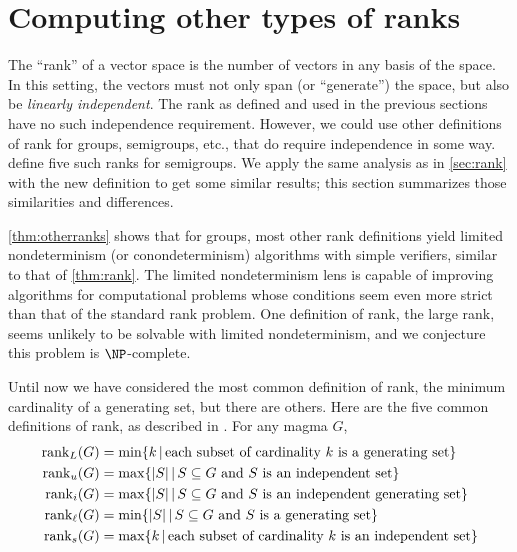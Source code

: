 \section{Computing other types of ranks}
\label{sec:otherranks}

%
%
%
The ``rank'' of a vector space is the number of vectors in any basis of the space.
In this setting, the vectors must not only span (or ``generate'') the space, but also be \emph{linearly independent}.
The rank as defined and used in the previous sections have no such independence requirement.
%
%
However, we could use other definitions of rank for groups, semigroups, etc., that do require independence in some way.
\autocite{hr99, hr00} define five such ranks for semigroups.
%
%
We apply the same analysis as in \autoref{sec:rank} with the new definition to get some similar results;
%
%
this section summarizes those similarities and differences.

%
%
%
\autoref{thm:otherranks} shows that for groups, most other rank definitions yield limited nondeterminism (or conondeterminism) algorithms with simple verifiers, similar to that of \autoref{thm:rank}.
%
%
The limited nondeterminism lens is capable of improving algorithms for computational problems whose conditions seem even more strict than that of the standard rank problem.
%
One definition of rank, the large rank, seems unlikely to be solvable with limited nondeterminism, and we conjecture this problem is $\NP$-complete.

Until now we have considered the most common definition of rank, the minimum cardinality of a generating set, but there are others.
Here are the five common definitions of rank, as described in \autocite{hr99, hr00}.
For any magma $G$,
\begin{align*}
  \operatorname{rank}_L(G) & = \min \{ k \, | \, \text{each subset of cardinality } k \text{ is a generating set}\} \\
  \operatorname{rank}_u(G) & = \max \{ |S| \, | \, S \subseteq G \text{ and } S \text{ is an independent set} \} \\
  \operatorname{rank}_i(G) & = \max \{ |S| \, | \, S \subseteq G \text{ and } S \text{ is an independent generating set} \} \\
  \operatorname{rank}_\ell(G) & = \min \{ |S| \, | \, S \subseteq G \text{ and } S \text{ is a generating set} \} \\
  \operatorname{rank}_s(G) & = \max \{ k \, | \, \text{each subset of cardinality } k \text{ is an independent set} \}
\end{align*}

